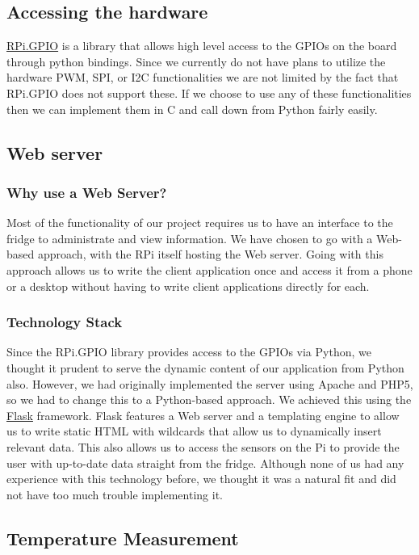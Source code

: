 \documentclass[10pt]{article}
\begin{document}
\subsection{Accessing the hardware}
\href{https://pypi.python.org/pypi/RPi.GPIO}{RPi.GPIO} is a library that allows high level access to the GPIOs on the board through python bindings. Since we currently do not have plans to utilize the hardware PWM, SPI, or I2C functionalities we are not limited by the fact that RPi.GPIO does not support these. If we choose to use any of these functionalities then we can implement them in C and call down from Python fairly easily.

\subsection{Web server}
\subsubsection{Why use a Web Server?}

Most of the functionality of our project requires us to have an interface to the fridge to administrate and view information. We have chosen to go with a Web-based approach, with the RPi itself hosting the Web server. Going with this approach allows us to write the client application once and access it from a phone or a desktop without having to write client applications directly for each.

\subsubsection{Technology Stack}

Since the RPi.GPIO library provides access to the GPIOs via Python, we thought it prudent to serve the dynamic content of our application from Python also. However, we had originally implemented the server using Apache and PHP5, so we had to change this to a Python-based approach. We achieved this using the \href{http://flask.pocoo.org/}{Flask} framework. Flask features a Web server and a templating engine to allow us to write static HTML with wildcards that allow us to dynamically insert relevant data. This also allows us to access the sensors on the Pi to provide the user with up-to-date data straight from the fridge. Although none of us had any experience with this technology before, we thought it was a natural fit and did not have too much trouble implementing it.

\subsection{Temperature Measurement}
\end{document}
